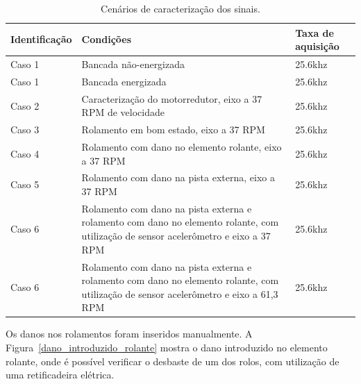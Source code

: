 \documentclass[
	12pt,				
	oneside,			
	a4paper,			
	english,			
	brazil,			
	]{abntex2ppgsi}
\begin{document}
\begin{table}[h]
\caption{Cenários de caracterização dos sinais.}
\begin{tabularx}{\textwidth}{|X|X|X|}
\hline
Identificação & Condições~                                                                                                                          & Taxa de aquisição  \\ 
\hline
Caso
1        & Bancada não-energizada                                                                                                              & 25.6khz            \\ 
\hline
Caso 1        & Bancada energizada                                                                                                                  & 25.6khz            \\ 
\hline
Caso 2        & Caracterização do motorredutor, eixo a 37 RPM de velocidade                                                                         & 25.6khz            \\ 
\hline
Caso 3        & Rolamento em bom estado, eixo a 37 RPM                                                                                              & 25.6khz            \\ 
\hline
Caso 4        & Rolamento com dano no elemento rolante, eixo a 37 RPM                                                                               & 25.6khz            \\ 
\hline
Caso 5        & Rolamento com dano na pista externa, eixo a 37 RPM                                                                                  & 25.6khz            \\ 
\hline
Caso 6        & Rolamento com dano na pista externa e rolamento com dano no elemento rolante, com utilização de sensor acelerômetro e eixo a 37 RPM & 25.6khz            \\
\hline
Caso 6        & Rolamento com dano na pista externa e rolamento com dano no elemento rolante, com utilização de sensor acelerômetro e eixo a 61,3 RPM & 25.6khz            \\
\hline
\end{tabularx}
\label{tab:conjuntoDeTestes}
\end{table}

Os danos nos rolamentos foram inseridos manualmente. A Figura~\ref{dano_introduzido_rolante} mostra o dano introduzido no elemento rolante, onde é possível verificar o desbaste de um dos rolos, com utilização de uma retificadeira elétrica.
\end{document}
